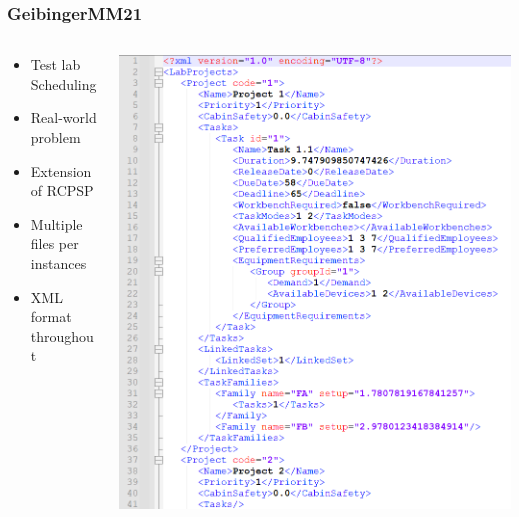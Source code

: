 \documentclass[dvipsnames,aspectratio=169]{beamer}
\begin{document}
\begin{frame}
\frametitle{GeibingerMM21 \cite{GeibingerMM21}}
\begin{columns}
\begin{column}{0.4\textwidth}
\begin{itemize}
\item Test lab Scheduling
\item Real-world problem
\item Extension of RCPSP
\item Multiple files per instances
\item XML format throughout
\end{itemize}
\end{column}
\begin{column}{0.6\textwidth}
\includegraphics[width=.7\textwidth]{images/GeibingerMM21}
\end{column}
\end{columns}
\end{frame}
\end{document}
